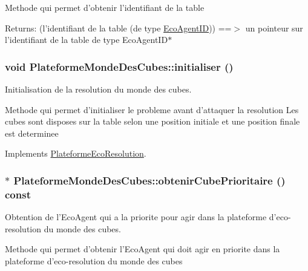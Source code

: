 Methode qui permet d'obtenir l'identifiant de la table

\begin{Desc}
\item[Returns:](l'identifiant de la table (de type \hyperlink{classEcoAgentID}{EcoAgentID})) ==$>$ un pointeur sur l'identifiant de la table de type EcoAgentID$\ast$ \end{Desc}
\hypertarget{classPlateformeMondeDesCubes_67160be6f5ecd0b8f3fffeb1a7bd81ba}{
\subsubsection[{initialiser}]{\setlength{\rightskip}{0pt plus 5cm}void PlateformeMondeDesCubes::initialiser ()}}
\label{classPlateformeMondeDesCubes_67160be6f5ecd0b8f3fffeb1a7bd81ba}


Initialisation de la resolution du monde des cubes. 

Methode qui permet d'initialiser le probleme avant d'attaquer la resolution Les cubes sont disposes sur la table selon une position initiale et une position finale est determinee 

Implements \hyperlink{classPlateformeEcoResolution_57d87139f09ca51cd6a4fa7cd2e83351}{PlateformeEcoResolution}.\hypertarget{classPlateformeMondeDesCubes_5f3ebe8acdfdbb447c13de8d3cbac438}{
\subsubsection[{obtenirCubePrioritaire}]{ $\ast$ PlateformeMondeDesCubes::obtenirCubePrioritaire () const}}
\label{classPlateformeMondeDesCubes_5f3ebe8acdfdbb447c13de8d3cbac438}


Obtention de l'EcoAgent qui a la priorite pour agir dans la plateforme d'eco-resolution du monde des cubes. 

Methode qui permet d'obtenir l'EcoAgent qui doit agir en priorite dans la plateforme d'eco-resolution du monde des cubes

